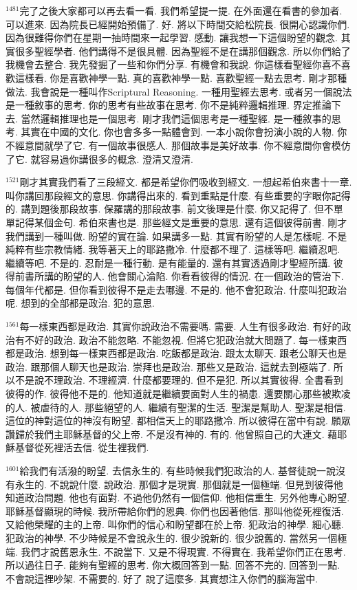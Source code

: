 \documentclass{book}
\begin{document}
$^{1481}$完了之後大家都可以再去看一看.
我們希望提一提.
在外面還在看書的參加者.
可以進來.
因為院長已經開始預備了.
好.
將以下時間交給松院長.
很開心認識你們.
因為很難得你們在星期一抽時間來一起學習.
感動.
讓我想一下這個盼望的觀念.
其實很多聖經學者.
他們講得不是很具體.
因為聖經不是在講那個觀念.
所以你們給了我機會去整合.
我先發掘了一些和你們分享.
有機會和我說.
你這樣看聖經你喜不喜歡這樣看.
你是喜歡神學一點.
真的喜歡神學一點.
喜歡聖經一點去思考.
剛才那種做法.
我會說是一種叫作Scriptural Reasoning.
一種用聖經去思考.
或者另一個說法是一種敘事的思考.
你的思考有些故事在思考.
你不是純粹邏輯推理.
界定推論下去.
當然邏輯推理也是一個思考.
剛才我們這個思考是一種聖經.
是一種敘事的思考.
其實在中國的文化.
你也會多多一點體會到.
一本小說你會扮演小說的人物.
你不經意間就學了它.
有一個故事很感人.
那個故事是美好故事.
你不經意間你會模仿了它.
就容易過你講很多的概念.
澄清又澄清.

$^{1521}$剛才其實我們看了三段經文.
都是希望你們吸收到經文.
一想起希伯來書十一章.
叫你講回那段經文的意思.
你講得出來的.
看到重點是什麼.
有些重要的字眼你記得的.
講到題後那段故事.
保羅講的那段故事.
前文後理是什麼.
你又記得了.
但不單單記得某個金句.
希伯來書也是.
那些經文是重要的意思.
還有這個彼得前書.
剛才我們講到一種叫做.
盼望的實在論.
如果講多一點.
其實有盼望的人是怎樣呢.
不是純粹有些宗教情緒.
我等著天上的耶路撒冷.
什麼都不理了.
這樣等吧.
繼續忍吧.
繼續等吧.
不是的.
忍耐是一種行動.
是有能量的.
還有其實透過剛才聖經所講.
彼得前書所講的盼望的人.
他會關心淪陷.
你看看彼得的情況.
在一個政治的管治下.
每個年代都是.
但你看到彼得不是走去哪邊.
不是的.
他不會犯政治.
什麼叫犯政治呢.
想到的全部都是政治.
犯的意思.

$^{1561}$每一樣東西都是政治.
其實你說政治不需要嗎.
需要.
人生有很多政治.
有好的政治有不好的政治.
政治不能忽略.
不能忽視.
但將它犯政治就大問題了.
每一樣東西都是政治.
想到每一樣東西都是政治.
吃飯都是政治.
跟太太聊天.
跟老公聊天也是政治.
跟那個人聊天也是政治.
崇拜也是政治.
那些又是政治.
這就去到極端了.
所以不是說不理政治.
不理經濟.
什麼都要理的.
但不是犯.
所以其實彼得.
全書看到彼得的作.
彼得他不是的.
他知道就是繼續要面對人生的禍患.
還要關心那些被欺凌的人.
被虐待的人.
那些絕望的人.
繼續有聖潔的生活.
聖潔是幫助人.
聖潔是相信.
這位的神對這位的神沒有盼望.
都相信天上的耶路撒冷.
所以彼得在當中有說.
願眾讚歸於我們主耶穌基督的父上帝.
不是沒有神的.
有的.
他曾照自己的大連文.
藉耶穌基督從死裡活去信.
從生裡我們.

$^{1601}$給我們有活潑的盼望.
去信永生的.
有些時候我們犯政治的人.
基督徒說一說沒有永生的.
不說說什麼.
說政治.
那個才是現實.
那個就是一個極端.
但見到彼得他知道政治問題.
他也有面對.
不過他仍然有一個信仰.
他相信重生.
另外他專心盼望.
耶穌基督顯現的時候.
我所帶給你們的恩典.
你們也因著他信.
那叫他從死裡復活.
又給他榮耀的主的上帝.
叫你們的信心和盼望都在於上帝.
犯政治的神學.
細心聽.
犯政治的神學.
不少時候是不會說永生的.
很少說新的.
很少說舊的.
當然另一個極端.
我們才說舊恩永生.
不說當下.
又是不得現實.
不得實在.
我希望你們正在思考.
所以過往日子.
能夠有聖經的思考.
你大概回答到一點.
回答不完的.
回答到一點.
不會說這裡吵架.
不需要的.
好了 說了這麼多.
其實想注入你們的腦海當中.
\end{document}
